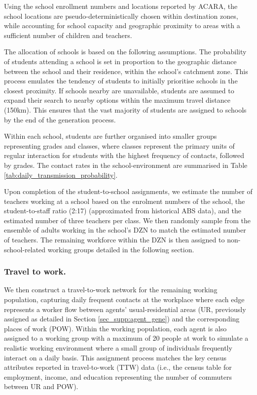 \documentclass{article}
\begin{document}
\begin{appendices}
Using the school enrollment numbers and locations reported by ACARA, the school locations are pseudo-deterministically chosen within destination zones, while accounting for school capacity and geographic proximity to areas with a sufficient number of children and teachers. 

The allocation of schools is based on the following assumptions. The probability of students attending a school is set in proportion to the geographic distance between the school and their residence, within the school's catchment zone. This process emulates the tendency of students to initially prioritise schools in the closest proximity. If schools nearby are unavailable, students are assumed to expand their search to nearby options within the maximum travel distance (150km). This ensures that the vast majority of students are assigned to schools by the end of the generation process. 

Within each school, students are further organised into smaller groups representing grades and classes, where classes represent the primary units of regular interaction for students with the highest frequency of contacts, followed by grades. The contact rates in the school-environment are summarised in Table \ref{tab:daily_transmission_probability}. %

Upon completion of the student-to-school assignments, we estimate the number of teachers working at a school based on the enrolment numbers of the school, the student-to-staff ratio (2:17) (approximated from historical ABS data), and the estimated number of three teachers per class. We then randomly sample from the ensemble of adults working in the school's DZN to match the estimated number of teachers. The remaining workforce within the DZN is then assigned to non-school-related working groups detailed in the following section. 

\subsubsection{Travel to work.}
\label{sec_supp:TTW_improve}
We then construct a travel-to-work network for the remaining working population, capturing daily frequent contacts at the workplace where each edge represents a worker flow between agents' usual-residential areas (UR, previously assigned as detailed in Section \ref{sec_supp:agent_gene}) and the corresponding places of work (POW). Within the working population, each agent is also assigned to a working group with a maximum of 20 people at work to simulate a realistic working environment where a small group of individuals frequently interact on a daily basis. This assignment process matches the key census attributes reported in travel-to-work (TTW) data  \cite{ABS_census} (i.e., the census table for employment, income, and education representing the number of commuters between UR and POW).


\end{appendices}
\end{document}
